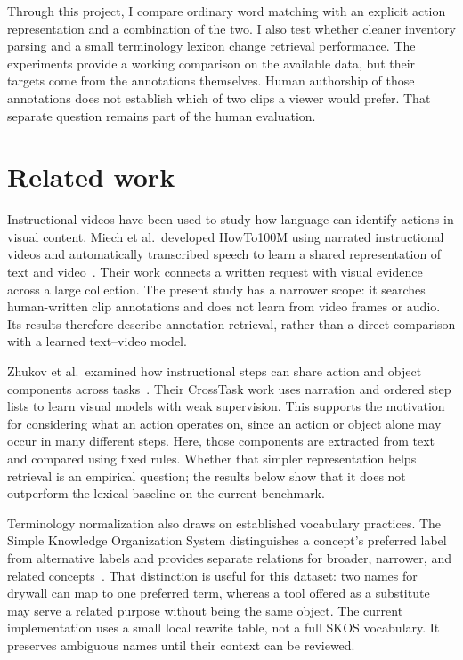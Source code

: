 \documentclass[11pt,letterpaper]{article}
\begin{document}
Through this project, I compare ordinary word matching with an explicit
action representation and a combination of the two. I also test whether
cleaner inventory parsing and a small terminology lexicon change retrieval
performance. The experiments provide a working comparison on the available
data, but their targets come from the annotations themselves. Human authorship
of those annotations does not establish which of two clips a viewer would
prefer. That separate question remains part of the human evaluation.

\section{Related work}
Instructional videos have been used to study how language can identify
actions in visual content. Miech et al.\ developed HowTo100M using narrated
instructional videos and automatically transcribed speech to learn a shared
representation of text and video~\cite{miech2019howto100m}. Their work connects
a written request with visual evidence across a large collection. The present
study has a narrower scope: it searches human-written clip annotations and
does not learn from video frames or audio. Its results therefore describe
annotation retrieval, rather than a direct comparison with a learned
text--video model.

Zhukov et al.\ examined how instructional steps can share action and object
components across tasks~\cite{zhukov2019crosstask}. Their CrossTask work uses
narration and ordered step lists to learn visual models with weak supervision.
This supports the motivation for considering what an action operates on,
since an action or object alone may occur in many different steps. Here,
those components are extracted from text and compared using fixed rules.
Whether that simpler representation helps retrieval is an empirical question;
the results below show that it does not outperform the lexical baseline on
the current benchmark.

Terminology normalization also draws on established vocabulary practices.
The Simple Knowledge Organization System distinguishes a concept's preferred
label from alternative labels and provides separate relations for broader,
narrower, and related concepts~\cite{skos2009}. That distinction is useful for
this dataset: two names for drywall can map to one preferred term, whereas
a tool offered as a substitute may serve a related purpose without being the
same object. The current implementation uses a small local rewrite table,
not a full SKOS vocabulary. It preserves ambiguous names until their context
can be reviewed.
\end{document}
